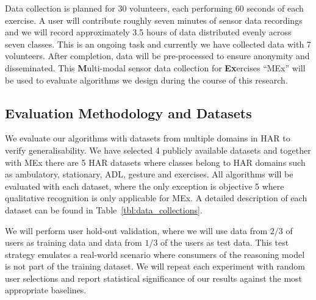 \documentclass[runningheads]{llncs}
\begin{document}
Data collection is planned for 30 volunteers, each performing 60 seconds of each exercise. A user will contribute roughly seven minutes of sensor data recordings and we will record approximately 3.5 hours of data distributed evenly across seven classes. This is an ongoing task and currently we have collected data with 7 volunteers. After completion, data will be pre-processed to ensure anonymity and disseminated. This \textbf{M}ulti-modal sensor data collection for \textbf{Ex}ercises ``MEx'' will be used to evaluate algorithms we design during the course of this research. 

\subsection{Evaluation Methodology and Datasets}
We evaluate our algorithms with datasets from multiple domains in HAR to verify generalisability. We have selected 4 publicly available datasets and together with MEx there are 5 HAR datasets where classes belong to HAR domains such as ambulatory, stationary, ADL, gesture and exercises. All algorithms will be evaluated with each dataset, where the only exception is objective 5 where qualitative recognition is only applicable for MEx. A detailed description of each dataset can be found in Table~\ref{tbl:data_collections}.

We will perform user hold-out validation, where we will use data from $2/3$ of users as training data and data from $1/3$ of the users as test data. This test strategy emulates a real-world scenario where consumers of the reasoning model is not part of the training dataset. We will repeat each experiment with random user selections and report statistical significance of our results against the most appropriate baselines.
\end{document}
